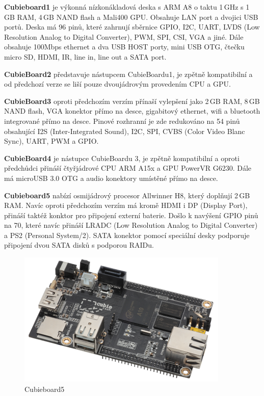 	\textbf{Cubieboard1} je výkonná nízkonákladová deska s ARM A8 o taktu 1\,GHz s 1\,GB RAM, 4\,GB NAND flash a Mali400 GPU. Obsahuje LAN port a dvojici USB portů. Deska má 96 pinů, které zahrnují sběrnice GPIO, I2C, UART, LVDS (Low Resolution Analog to Digital Converter), PWM, SPI, CSI, VGA a jiné. Dále obsahuje 100Mbps ethernet a dva USB HOST porty, mini USB OTG, čtečku micro SD, HDMI, IR, line in, line out a SATA port.
	
	\textbf{CubieBoard2} představuje nástupcem CubieBoardu1, je zpětně kompatibilní a od předchozí verze se liší pouze dvoujádrovým provedením CPU a GPU.
		
	\textbf{CubieBoard3} oproti předchozím verzím přínaší vylepšení jako 2\,GB RAM, 8\,GB NAND flash, VGA konektor přímo na desce, gigabitový ethernet, wifi a bluetooth integrované přímo na desce. Pinové rozhranní je zde redukováno na 54 pinů obsahující I2S (Inter-Integrated Sound), I2C, SPI, CVBS (Color Video Blanc Sync), UART, PWM a GPIO.
	
		\textbf{CubieBoard4} je nástupce CubieBoardu 3, je zpětně kompatibilní a oproti předchůdci přináší čtyřjádrové CPU ARM A15x a GPU PowerVR G6230. Dále má microUSB 3.0 OTG a audio konektory umístěné přímo na desce.
		
			\textbf{Cubieboard5 }nabízí osmijádrový procesor Allwinner H8, který doplňují 2\,GB RAM. Navíc oproti předchozím verzím má kromě HDMI i DP (Display Port), přináší taktéž konktor pro připojení externí baterie. Došlo k navýšení GPIO pinů na 70, které navíc přináší LRADC (Low Resolution Analog to Digital Converter) a PS2 (Personal System/2). SATA konektor pomocí speciální desky podporuje připojení dvou SATA disků s podporou RAIDu.
		
	\begin{figure}[!h]
  \begin{center}
    \includegraphics[scale=0.35]{obrazky/embed_cubie_1}
  \end{center}
  \caption{Cubieboard5 \cite{CubieBoards}}
\end{figure}
		

